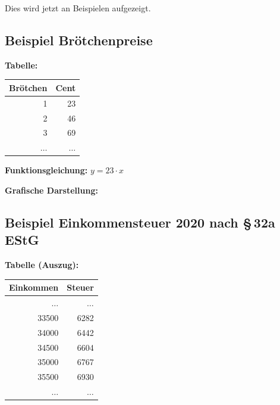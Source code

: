 Dies wird jetzt an Beispielen aufgezeigt.

\subsection{Beispiel Brötchenpreise}

\textbf{Tabelle:}
\begin{center}
  \begin{tabular}{rr}
    \hline
    Brötchen & Cent\\
    \hline
    1 & 23\\
    2 & 46\\
    3 & 69\\
    $\ldots$ & $\ldots$\\
    \hline
  \end{tabular}
\end{center}

\textbf{Funktionsgleichung:} $y = 23 \cdot x$

\textbf{Grafische Darstellung:}
\begin{center}
\end{center}
\beispielende

\subsection{Beispiel Einkommensteuer 2020 nach §\,32a EStG}

\textbf{Tabelle (Auszug):}
\begin{center}
  \begin{tabular}{rr}
    \hline
    Einkommen & Steuer\\
    \hline
    $\ldots$ & $\ldots$\\
    33500 & 6282\\
    34000 & 6442\\
    34500 & 6604\\
    35000 & 6767\\
    35500 & 6930\\
    $\ldots$ & $\ldots$\\
    \hline
  \end{tabular}
\end{center}

